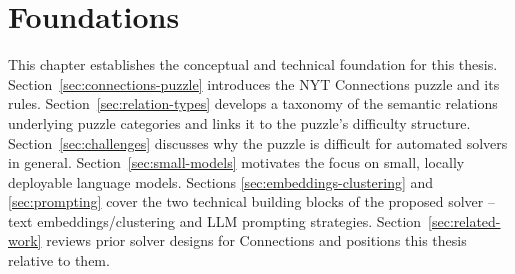 
\chapter{Foundations}
\label{ch:foundations}

This chapter establishes the conceptual and technical foundation for this thesis. Section~\ref{sec:connections-puzzle} introduces
the NYT Connections puzzle and its rules. Section~\ref{sec:relation-types}
develops a taxonomy of the semantic relations underlying puzzle categories
and links it to the puzzle's difficulty structure.
Section~\ref{sec:challenges} discusses why the puzzle is difficult for
automated solvers in general. Section~\ref{sec:small-models} motivates the
focus on small, locally deployable language models. Sections
\ref{sec:embeddings-clustering} and \ref{sec:prompting} cover the two
technical building blocks of the proposed solver -- text
embeddings/clustering and LLM prompting strategies.
Section~\ref{sec:related-work} reviews prior solver designs for
Connections and positions this thesis relative to them.


\label{sec:connections-puzzle}


